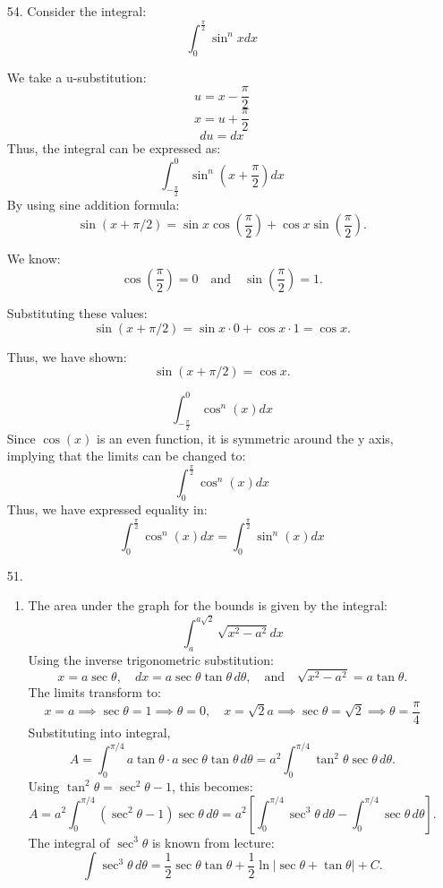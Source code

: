 \documentclass[12pt]{article}
\begin{document}
\begin{enumerate}
\item [54. ]
Consider the integral:
\[
\int_0^{\frac{\pi}{2}}\sin^n x dx
\]

We take a u-substitution:
\[
u = x - \frac{\pi}{2}
\]
\[
x = u + \frac{\pi}{2}
\]
\[
du = dx
\]
Thus, the integral can be expressed as:
\[
\int_{-\frac{\pi}{2}}^0 \sin^n\left(x+\frac{\pi}{2}\right)dx
\]
By using sine addition formula:
\[
\sin(x + \pi/2) = \sin x \cos\left(\frac{\pi}{2}\right) + \cos x \sin\left(\frac{\pi}{2}\right).
\]

We know:
\[
\cos\left(\frac{\pi}{2}\right) = 0 \quad \text{and} \quad \sin\left(\frac{\pi}{2}\right) = 1.
\]

Substituting these values:
\[
\sin(x + \pi/2) = \sin x \cdot 0 + \cos x \cdot 1 = \cos x.
\]

Thus, we have shown:
\[
\sin(x + \pi/2) = \cos x.
\]

\[
\int_{-\frac{\pi}{2}}^0 \cos^n\left(x\right)dx
\]
Since $\cos(x)$ is an even function, it is symmetric around the y axis, implying that the limits can be changed to:
\[
\int_0^{\frac{\pi}{2}} \cos^n\left(x\right)dx
\]
Thus, we have expressed equality in:
\[
\int_0^{\frac{\pi}{2}} \cos^n\left(x\right)dx = \int_0^{\frac{\pi}{2}}\sin^n (x) dx
\]

\item [51. ]
\begin{enumerate}
    \item 

The area under the graph for the bounds is given by the integral:
\[
\int_{a}^{a\sqrt{2}} \sqrt{x^2 - a^2} dx
\]
Using the inverse trigonometric substitution:
\[
x = a \sec\theta, \quad dx = a \sec\theta \tan\theta \, d\theta, \quad \text{and} \quad \sqrt{x^2 - a^2} = a \tan\theta.
\]
The limits transform to:
\[
x = a \implies \sec\theta = 1 \implies \theta = 0, \quad
x = \sqrt{2}a \implies \sec\theta = \sqrt{2} \implies \theta = \frac{\pi}{4}
\]
Substituting into integral,
\[
A = \int_0^{\pi/4} a \tan\theta \cdot a \sec\theta \tan\theta \, d\theta = a^2 \int_0^{\pi/4} \tan^2\theta \sec\theta \, d\theta.
\]
Using \( \tan^2\theta = \sec^2\theta - 1 \), this becomes:
\[
A = a^2 \int_0^{\pi/4} (\sec^2\theta - 1) \sec\theta \, d\theta = a^2 \left[\int_0^{\pi/4} \sec^3\theta \, d\theta - \int_0^{\pi/4} \sec\theta \, d\theta \right].
\]
The integral of \( \sec^3\theta \) is known from lecture:
\[
\int \sec^3\theta \, d\theta = \frac{1}{2} \sec\theta \tan\theta + \frac{1}{2} \ln|\sec\theta + \tan\theta| + C.
\]


\end{enumerate}
\end{enumerate}
\end{document}
